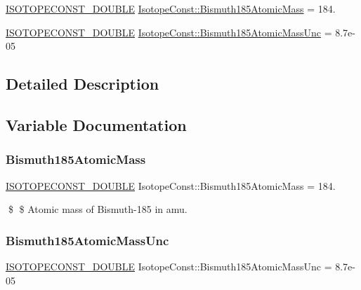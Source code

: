 \begin{DoxyCompactItemize}
\item 
\mbox{\hyperlink{group___isotope_const-_macros_ga8f45a7272ce02c0b4c65c44636ed719a}{I\+S\+O\+T\+O\+P\+E\+C\+O\+N\+S\+T\+\_\+\+D\+O\+U\+B\+LE}} \mbox{\hyperlink{group___isotope_const-_bismuth-_bi185_ga3a2e215434a3b5e7b489ca597acf480c}{Isotope\+Const\+::\+Bismuth185\+Atomic\+Mass}} = 184.
\item 
\mbox{\hyperlink{group___isotope_const-_macros_ga8f45a7272ce02c0b4c65c44636ed719a}{I\+S\+O\+T\+O\+P\+E\+C\+O\+N\+S\+T\+\_\+\+D\+O\+U\+B\+LE}} \mbox{\hyperlink{group___isotope_const-_bismuth-_bi185_gac1fe5d663b6b314b612d4d5a8bea10d5}{Isotope\+Const\+::\+Bismuth185\+Atomic\+Mass\+Unc}} = 8.\+7e-\/05
\end{DoxyCompactItemize}


\subsection{Detailed Description}


\subsection{Variable Documentation}
\mbox{\label{group___isotope_const-_bismuth-_bi185_ga3a2e215434a3b5e7b489ca597acf480c}} 
\subsubsection{\texorpdfstring{Bismuth185\+Atomic\+Mass}{Bismuth185AtomicMass}}
{\footnotesize\ttfamily \mbox{\hyperlink{group___isotope_const-_macros_ga8f45a7272ce02c0b4c65c44636ed719a}{I\+S\+O\+T\+O\+P\+E\+C\+O\+N\+S\+T\+\_\+\+D\+O\+U\+B\+LE}} Isotope\+Const\+::\+Bismuth185\+Atomic\+Mass = 184.}

\$ \$ Atomic mass of Bismuth-\/185 in amu. \mbox{\label{group___isotope_const-_bismuth-_bi185_gac1fe5d663b6b314b612d4d5a8bea10d5}} 
\subsubsection{\texorpdfstring{Bismuth185\+Atomic\+Mass\+Unc}{Bismuth185AtomicMassUnc}}
{\footnotesize\ttfamily \mbox{\hyperlink{group___isotope_const-_macros_ga8f45a7272ce02c0b4c65c44636ed719a}{I\+S\+O\+T\+O\+P\+E\+C\+O\+N\+S\+T\+\_\+\+D\+O\+U\+B\+LE}} Isotope\+Const\+::\+Bismuth185\+Atomic\+Mass\+Unc = 8.\+7e-\/05}

